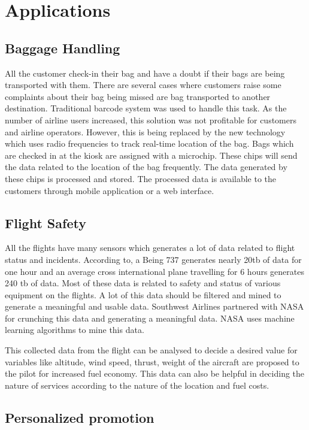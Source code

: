 \documentclass[sigconf]{acmart}
\begin{document}
\section{Applications}

\subsection{Baggage Handling}

All the customer check-in their bag and have a doubt if their bags are being transported with them. There are several cases where customers raise some complaints about their bag being missed are bag transported to another destination. Traditional barcode system was used to handle this task. As the number of airline users increased, this solution was not profitable for customers and airline operators. However, this is being replaced by the new technology which uses radio frequencies to track real-time location of the bag. Bags which are checked in at the kiosk are assigned with a microchip. These chips will send the data related to the location of the bag frequently.  The data generated by these chips is processed and stored. The processed data is available to the customers through mobile application or a web interface.
\subsection{Flight Safety}

All the flights have many sensors which generates a lot of data related to flight status and incidents. According to, a Being 737 generates nearly 20tb of data for one hour and an average cross international plane travelling for 6 hours generates 240 tb of data.  Most of these data is related to safety and status of various equipment on the flights. A lot of this data should be filtered and mined to generate a meaningful and usable data. Southwest Airlines partnered with NASA for crunching this data and generating a meaningful data. NASA uses machine learning algorithms to mine this data. 


This collected data from the flight can be analysed to decide a desired value for variables like altitude, wind speed, thrust, weight of the aircraft are proposed to the pilot for increased fuel economy. This data can also be helpful in deciding the nature of services according to the nature of the location and fuel costs.

\subsection{Personalized promotion}
\end{document}
